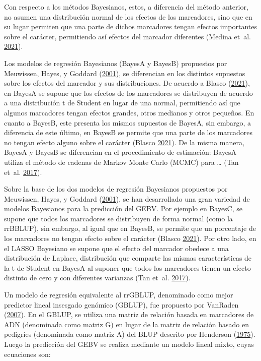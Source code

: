 \documentclass[11pt,spanish,a4paper,oneside,]{book} %
\begin{document}
Con respecto a los métodos Bayesianos, estos, a diferencia del método anterior, no asumen una distribución normal de los efectos de los marcadores, sino que en su lugar permiten que una parte de dichos marcadores tengan efectos importantes sobre el carácter, permitiendo así efectos del marcador diferentes (Medina et~al. \protect\hyperlink{ref-cite:38}{2021}).

Los modelos de regresión Bayesianos (BayesA y BayesB) propuestos por Meuwissen, Hayes, y Goddard (\protect\hyperlink{ref-cite:8}{2001}), se diferencian en los distintos supuestos sobre los efectos del marcador y sus distribuciones. De acuerdo a Blasco (\protect\hyperlink{ref-cite:21}{2021}), en BayesA se supone que los efectos de los marcadores se distribuyen de acuerdo a una distribución t de Student en lugar de una normal, permitiendo así que algunos marcadores tengan efectos grandes, otros medianos y otros pequeños. En cuanto a BayesB, este presenta los mismos supuestos de BayesA, sin embargo, a diferencia de este último, en BayesB se permite que una parte de los marcadores no tengan efecto alguno sobre el carácter (Blasco \protect\hyperlink{ref-cite:21}{2021}). De la misma manera, BayesA y BayesB se diferencian en el procedimiento de estimación: BayesA utiliza el método de cadenas de Markov Monte Carlo (MCMC) para \ldots{} (Tan et~al. \protect\hyperlink{ref-cite:34}{2017}).

Sobre la base de los dos modelos de regresión Bayesianos propuestos por Meuwissen, Hayes, y Goddard (\protect\hyperlink{ref-cite:8}{2001}), se han desarrollado una gran variedad de modelos Bayesianos para la predicción del GEBV. Por ejemplo en BayesC, se supone que todos los marcadores se distribuyen de forma normal (como la rrBBLUP), sin embargo, al igual que en BayesB, se permite que un porcentaje de los marcadores no tengan efecto sobre el carácter (Blasco \protect\hyperlink{ref-cite:21}{2021}). Por otro lado, en el LASSO Bayesiano se supone que el efecto del marcador obedece a una distribución de Laplace, distribución que comparte las mismas características de la t de Student en BayesA al suponer que todos los marcadores tienen un efecto distinto de cero y con diferentes varianzas (Tan et~al. \protect\hyperlink{ref-cite:34}{2017}).

Un modelo de regresión equivalente al rrGBLUP, denominado como mejor predictor lineal insesgado genómico (GBLUP), fue propuesto por VanRaden (\protect\hyperlink{ref-cite:39}{2007}). En el GBLUP, se utiliza una matriz de relación basada en marcadores de ADN (denominada como matriz G) en lugar de la matriz de relación basado en pedigríes (denominada como matriz A) del BLUP descrito por Henderson (\protect\hyperlink{ref-cite:41}{1975}). Luego la predicción del GEBV se realiza mediante un modelo lineal mixto, cuyas ecuaciones son:
\end{document}
